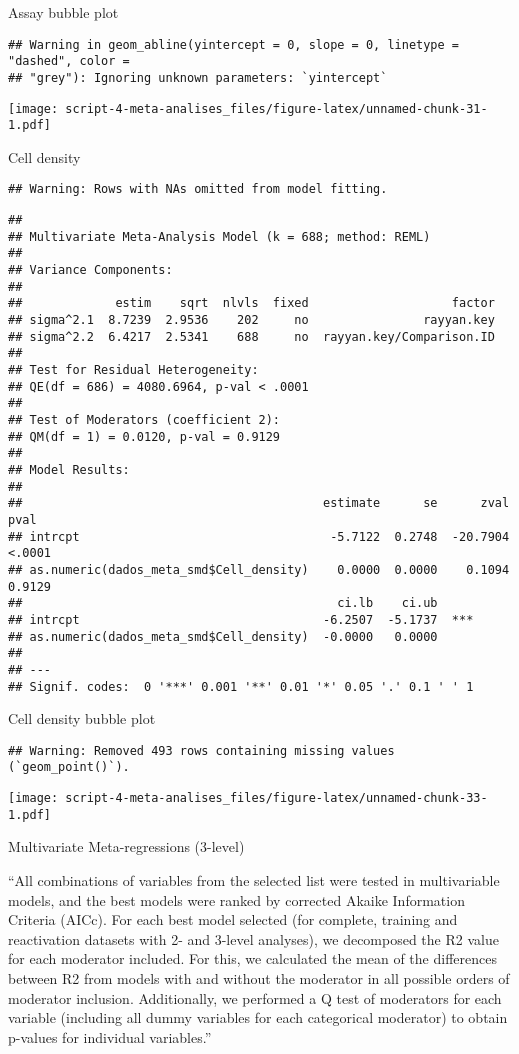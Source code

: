 \documentclass[
]{article}
\begin{document}
Assay bubble plot

\begin{verbatim}
## Warning in geom_abline(yintercept = 0, slope = 0, linetype = "dashed", color =
## "grey"): Ignoring unknown parameters: `yintercept`
\end{verbatim}

\texttt{[image: script-4-meta-analises\_files/figure-latex/unnamed-chunk-31-1.pdf]}

Cell density

\begin{verbatim}
## Warning: Rows with NAs omitted from model fitting.
\end{verbatim}

\begin{verbatim}
## 
## Multivariate Meta-Analysis Model (k = 688; method: REML)
## 
## Variance Components:
## 
##             estim    sqrt  nlvls  fixed                    factor 
## sigma^2.1  8.7239  2.9536    202     no                rayyan.key 
## sigma^2.2  6.4217  2.5341    688     no  rayyan.key/Comparison.ID 
## 
## Test for Residual Heterogeneity:
## QE(df = 686) = 4080.6964, p-val < .0001
## 
## Test of Moderators (coefficient 2):
## QM(df = 1) = 0.0120, p-val = 0.9129
## 
## Model Results:
## 
##                                          estimate      se      zval    pval 
## intrcpt                                   -5.7122  0.2748  -20.7904  <.0001 
## as.numeric(dados_meta_smd$Cell_density)    0.0000  0.0000    0.1094  0.9129 
##                                            ci.lb    ci.ub      
## intrcpt                                  -6.2507  -5.1737  *** 
## as.numeric(dados_meta_smd$Cell_density)  -0.0000   0.0000      
## 
## ---
## Signif. codes:  0 '***' 0.001 '**' 0.01 '*' 0.05 '.' 0.1 ' ' 1
\end{verbatim}

Cell density bubble plot

\begin{verbatim}
## Warning: Removed 493 rows containing missing values (`geom_point()`).
\end{verbatim}

\texttt{[image: script-4-meta-analises\_files/figure-latex/unnamed-chunk-33-1.pdf]}

Multivariate Meta-regressions (3-level)

``All combinations of variables from the selected list were tested in
multivariable models, and the best models were ranked by corrected
Akaike Information Criteria (AICc). For each best model selected (for
complete, training and reactivation datasets with 2- and 3-level
analyses), we decomposed the R2 value for each moderator included. For
this, we calculated the mean of the differences between R2 from models
with and without the moderator in all possible orders of moderator
inclusion. Additionally, we performed a Q test of moderators for each
variable (including all dummy variables for each categorical moderator)
to obtain p-values for individual variables.''
\end{document}
